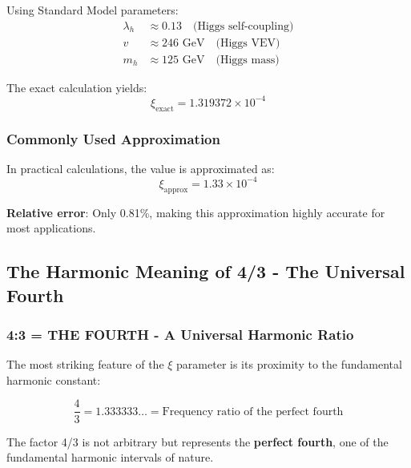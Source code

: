 \documentclass[12pt,a4paper]{article}
\newcommand{\xipar}{\ensuremath{\xi}}
\newcommand{\lambdah}{\ensuremath{\lambda_h}}
\newcommand{\mytimes}{\ensuremath{\times}}
\newcommand{\myapprox}{\ensuremath{\approx}}
\begin{document}
			Using Standard Model parameters:
			\begin{align}
				\lambdah &\myapprox 0.13 \quad \text{(Higgs self-coupling)} \\
				v &\myapprox 246 \text{ GeV} \quad \text{(Higgs VEV)} \\
				m_h &\myapprox 125 \text{ GeV} \quad \text{(Higgs mass)}
			\end{align}
			
			The exact calculation yields:
			\begin{equation}
				\xipar_{\text{exact}} = 1.319372 \mytimes 10^{-4}
				\label{eq:xi_exact}
			\end{equation}
			
			\subsubsection{Commonly Used Approximation}
			\label{subsubsec:approximation}
			
			In practical calculations, the value is approximated as:
			\begin{equation}
				\xipar_{\text{approx}} = 1.33 \mytimes 10^{-4}
				\label{eq:xi_approx}
			\end{equation}
			
			\textbf{Relative error}: Only 0.81\%, making this approximation highly accurate for most applications.
			
			\subsection{The Harmonic Meaning of 4/3 - The Universal Fourth}
			\label{subsec:four_thirds_proximity}
			
			\subsubsection{4:3 = THE FOURTH - A Universal Harmonic Ratio}
			\label{subsubsec:four_thirds_connection}
			
			The most striking feature of the $\xi$ parameter is its proximity to the fundamental harmonic constant:
			
			\begin{equation}
				\frac{4}{3} = 1.333333\ldots = \text{Frequency ratio of the perfect fourth}
				\label{eq:four_thirds}
			\end{equation}
			
			The factor 4/3 is not arbitrary but represents the \textbf{perfect fourth}, one of the fundamental harmonic intervals of nature.
			
\end{document}
